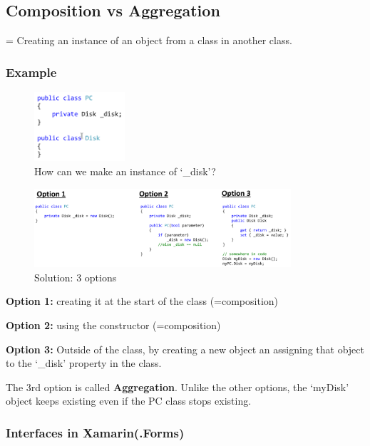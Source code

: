 \documentclass{article}
\newcommand{\bold}[1]{\textbf{#1}}
\begin{document}
\subsection{Composition vs Aggregation}

= Creating an instance of an object from a class in another class.

\subsubsection{Example}

\begin{figure}[H]
    \centering
    \includegraphics[width=0.3\textwidth]{composition1.png}
    \caption{How can we make an instance of `\_disk'?}
\end{figure}

\begin{figure}[H]
    \centering
    \includegraphics[width=0.85\textwidth]{composition2.png}
    \caption{Solution: 3 options}
\end{figure}

\bold{Option 1:} creating it at the start of the class (=composition)

\bold{Option 2:} using the constructor (=composition)

\bold{Option 3:} Outside of the class, by creating a new object an assigning that object to the `\_disk' property in the class.

The 3rd option is called \bold{Aggregation}. Unlike the other options, the `myDisk' object keeps existing even if the PC class stops existing.

\subsubsection{Interfaces in Xamarin(.Forms)}
\end{document}
